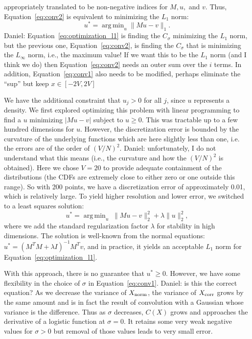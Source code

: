 \documentclass{article}
\DeclareMathOperator*{\argmin}{arg\,min}
\begin{document}
appropriately translated to be non-negative indices for $M, u,$ and $v$. Thus,
Equation~\ref{eq:conv2} is equivalent to minimizing the $L_1$ norm:
\begin{equation}\label{eq:optimization_l1}
    u^* = \argmin_{u} \|Mu-v\|_1.
\end{equation}
{\color{blue} Daniel: Equation~\ref{eq:optimization_l1} is finding
the $C_\sigma$ minimizing the $L_1$ norm, but the previous one,
Equation~\ref{eq:conv2}, is finding the $C_\sigma$ that is minimizing the
$L_\infty$ norm, i.e., the maximum value! If we want this to be the $L_1$ norm
(and I think we do) then Equation~\ref{eq:conv2} needs an outer sum over the $i$
terms. In addition, Equation~\ref{eq:conv1} also needs to be modified, perhaps
eliminate the ``sup'' but keep $x \in [-2V,2V]$}

We have the additional constraint that $u_j > 0$ for all $j$, since $u$
represents a density. We first explored optimizing this problem with linear
programming to find a $u$ minimizing $|Mu - v|$ subject to $u \ge 0$. This was
tractable up to a few hundred dimensions for $u$. However, the discretization
error is bounded by the curvature of the underlying functions which are here
slightly less than one, i.e.  the errors are of the order of $(V/N)^2$.
{\color{blue} Daniel: unfortunately, I do not understand what this means (i.e.,
the curvature and how the $(V/N)^2$ is obtained).} Here we chose $V=20$ to
provide adequate containment of the distributions (the CDFs are extremely close
to either zero or one outside this range). So with 200 points, we have a
discretization error of approximately 0.01, which is relatively large.  To yield
higher resolution and lower error, we switched to a least squares solution:
\begin{equation}\label{eq:optimization_l2}
    u^* = \argmin_u\; \|Mu-v\|_2^2 + \lambda \|u\|_2^2,
\end{equation}
where we add the standard regularization factor $\lambda$ for stability in high
dimensions. The solution is well-known from the normal equations: $u^* = (M^TM +
\lambda I)^{-1}M^Tv$, and in practice, it yields an acceptable $L_1$ norm for
Equation~\ref{eq:optimization_l1}.

With this approach, there is no guarantee that $u^* \geq 0$. However, we have
some flexibility in the choice of $\sigma$ in Equation~\ref{eq:conv1}.
{\color{blue} Daniel: is this the correct equation?} As we decrease the variance
of $X_{\rm norm}$, the variance of $X_{\rm corr}$ grows by the same amount and
is in fact the result of convolution with a Gaussian whose variance is the
difference.  Thus as $\sigma$ decreases, $C(X)$ grows and approaches the
derivative of a logistic function at $\sigma = 0$. It retains some very weak
negative values for $\sigma > 0$ but removal of those values leads to very small
error.
\end{document}
